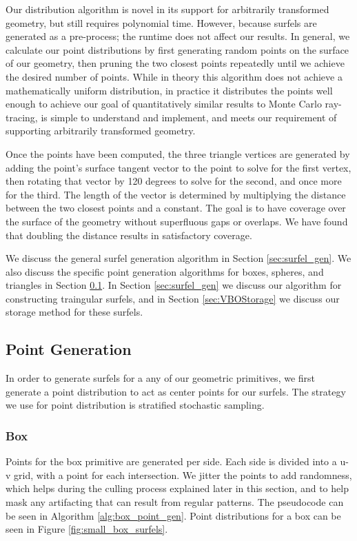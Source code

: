 Our distribution algorithm is novel in its support for arbitrarily transformed geometry, but still requires polynomial time. However, because surfels are generated as a pre-process; the runtime does not affect our results. In general, we calculate our point distributions by first generating random points on the surface of our geometry, then pruning the two closest points repeatedly until we achieve the desired number of points. While in theory this algorithm does not achieve a mathematically uniform distribution, in practice it distributes the points well enough to achieve our goal of quantitatively similar results to Monte Carlo ray-tracing, is simple to understand and implement, and meets our requirement of supporting arbitrarily transformed geometry.

Once the points have been computed, the three triangle vertices are generated by adding the point's surface tangent vector to the point to solve for the first vertex, then rotating that vector by 120 degrees to solve for the second, and once more for the third. The length of the vector is determined by multiplying the distance between the two closest points and a constant. The goal is to have coverage over the surface of the geometry without superfluous gaps or overlaps. We have found that doubling the distance results in satisfactory coverage.

We discuss the general surfel generation algorithm in Section \ref{sec:surfel_gen}. We also discuss the specific point generation algorithms for boxes, spheres, and triangles in Section \ref{sec:point_gen}. In Section \ref{sec:surfel_gen} we discuss our algorithm for constructing traingular surfels, and in Section \ref{sec:VBOStorage} we discuss our storage method for these surfels.

\subsection{Point Generation}
\label{sec:point_gen}

In order to generate surfels for a any of our geometric primitives, we first generate a point distribution to act as center points for our surfels. The strategy we use for point distribution is stratified stochastic sampling.

\subsubsection{Box}
\label{sec:box_point_gen}
Points for the box primitive are generated per side. Each side is divided into a u-v grid, with a point for each intersection. We jitter the points to add randomness, which helps during the culling process explained later in this section, and to help mask any artifacting that can result from regular patterns. The pseudocode can be seen in Algorithm \ref{alg:box_point_gen}. Point distributions for a box can be seen in Figure \ref{fig:small_box_surfels}.

